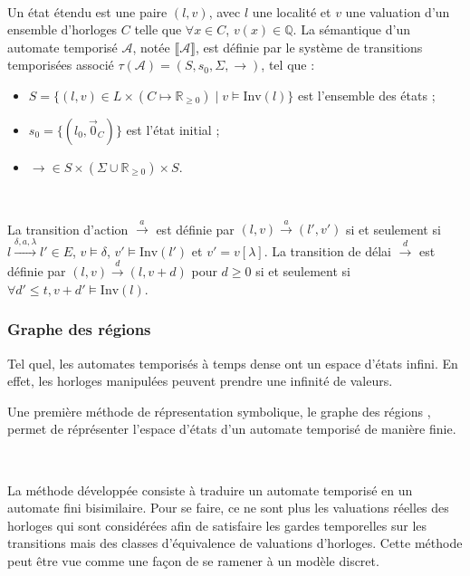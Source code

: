         ~
      
        Un état étendu est une paire $(l,v)$, avec $l$ une localité et $v$ une
        valuation d'un ensemble d'horloges $C$ telle que $\forall x \in C$,
        $v(x) \in \mathbb{Q}$. La sémantique d'un automate temporisé
        $\mathcal{A}$, notée $\llbracket\mathcal{A}\rrbracket$, est définie par
        le système de transitions temporisées associé $\tau(\mathcal{A}) = (S,
        s_0, \Sigma, \rightarrow)$, tel que :
        
        \begin{itemize}
          \item $S = \{(l,v) \in L \times (C \mapsto \mathbb{R}_{\geq 0}) \mid v
            \models \mathrm{Inv}(l)\}$ est l'ensemble des états ;
          \item $s_0 = \{(l_0,\vec{0}_C)\}$ est l'état initial ;
          \item $\rightarrow \in S\times (\Sigma \cup \mathbb{R}_{\geq 0})
            \times S$.
        \end{itemize}
        
        ~

        La transition d'action $\xrightarrow{a}$ est définie par $(l,v)
        \xrightarrow{a}(l',v')$ si et seulement si $l\xrightarrow{\delta, a,
          \lambda}l' \in E$, $v \models \delta$, $v'\models \mathrm{Inv}(l')$ et
        $v' = v[\lambda]$. La transition de délai $\xrightarrow{d}$ est définie
        par $(l,v) \xrightarrow{d}(l,v+d)$ pour $d \geq 0$ si et seulement si
        $\forall d' \leq t, v+d' \models \mathrm{Inv}(l)$.

      \subsubsection{Graphe des régions}
    
        Tel quel, les automates temporisés à temps dense ont un espace d'états
        infini. En effet, les horloges manipulées peuvent prendre une infinité
        de valeurs.
        
        Une première méthode de répresentation symbolique, le graphe des régions
        \cite{alur94}, permet de réprésenter l'espace d'états d'un automate
        temporisé de manière finie.

        ~

        La méthode développée consiste à traduire un automate temporisé en un
        automate fini bisimilaire. Pour se faire, ce ne sont plus les valuations
        réelles des horloges qui sont considérées afin de satisfaire les gardes
        temporelles sur les transitions mais des classes d'équivalence de
        valuations d'horloges. Cette méthode peut être vue comme une façon de se
        ramener à un modèle discret.
        
